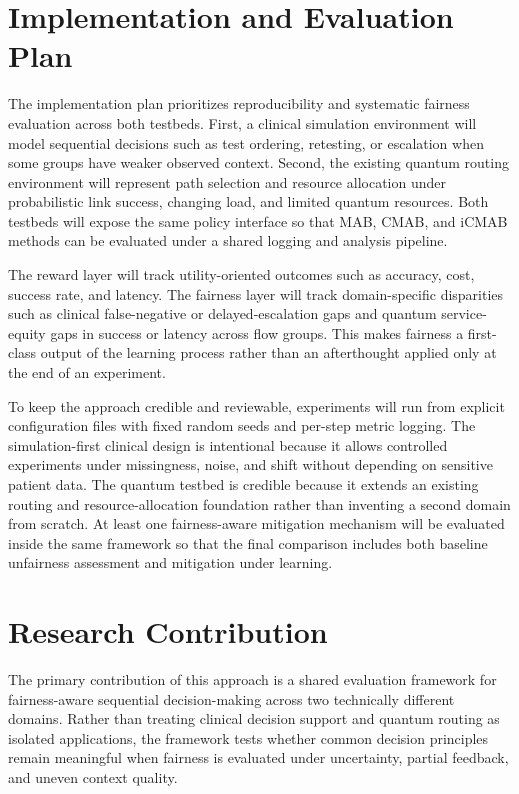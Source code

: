 \documentclass{IEEEtran}
\begin{document}
\section{Implementation and Evaluation Plan}
The implementation plan prioritizes reproducibility and systematic fairness
evaluation across both testbeds. First, a clinical simulation environment
will model sequential decisions such as test ordering, retesting, or
escalation when some groups have weaker observed context. Second, the
existing quantum routing environment will represent path selection and
resource allocation under probabilistic link success, changing load, and
limited quantum resources. Both testbeds will expose the same policy
interface so that MAB, CMAB, and iCMAB methods can be evaluated under a
shared logging and analysis pipeline.

The reward layer will track utility-oriented outcomes such as accuracy, cost,
success rate, and latency. The fairness layer will track domain-specific
disparities such as clinical false-negative or delayed-escalation gaps and
quantum service-equity gaps in success or latency across flow groups. This
makes fairness a first-class output of the learning process rather than an
afterthought applied only at the end of an experiment.

To keep the approach credible and reviewable, experiments will run from
explicit configuration files with fixed random seeds and per-step metric
logging. The simulation-first clinical design is intentional because it
allows controlled experiments under missingness, noise, and shift without
depending on sensitive patient data. The quantum testbed is credible because
it extends an existing routing and resource-allocation foundation rather than
inventing a second domain from scratch. At least one fairness-aware
mitigation mechanism will be evaluated inside the same framework so that the
final comparison includes both baseline unfairness assessment and mitigation
under learning.

\section{Research Contribution}
The primary contribution of this approach is a shared evaluation framework
for fairness-aware sequential decision-making across two technically
different domains. Rather than treating clinical decision support and quantum
routing as isolated applications, the framework tests whether common decision
principles remain meaningful when fairness is evaluated under uncertainty,
partial feedback, and uneven context quality.
\end{document}
